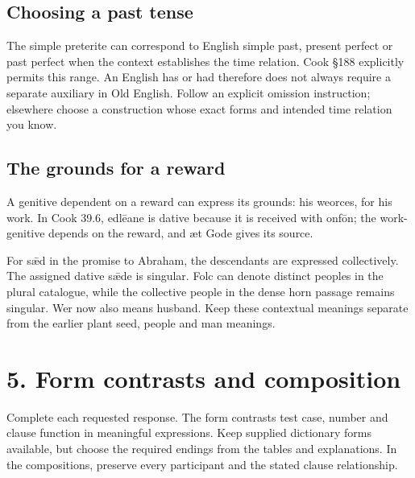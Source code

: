 \subsection*{Choosing a past tense}

The simple preterite can correspond to English simple past, present perfect or past perfect when the context establishes the time relation. Cook §188 explicitly permits this range. An English has or had therefore does not always require a separate auxiliary in Old English. Follow an explicit omission instruction; elsewhere choose a construction whose exact forms and intended time relation you know.

\subsection*{The grounds for a reward}

A genitive dependent on a reward can express its grounds: his weorces, for his work. In Cook 39.6, edlēane is dative because it is received with onfōn; the work-genitive depends on the reward, and æt Gode gives its source.

For sǣd in the promise to Abraham, the descendants are expressed collectively. The assigned dative sǣde is singular. Folc can denote distinct peoples in the plural catalogue, while the collective people in the dense horn passage remains singular. Wer now also means husband. Keep these contextual meanings separate from the earlier plant seed, people and man meanings.

\section*{5. Form contrasts and composition}

Complete each requested response. The form contrasts test case, number and clause function in meaningful expressions. Keep supplied dictionary forms available, but choose the required endings from the tables and explanations. In the compositions, preserve every participant and the stated clause relationship.


